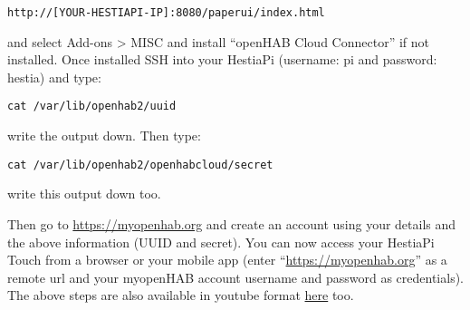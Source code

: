 \texttt{http://[YOUR-HESTIAPI-IP]:8080/paperui/index.html}

and select Add-ons > MISC and install ``openHAB Cloud Connector'' if not
installed. Once installed SSH into your HestiaPi (username: pi and password:
hestia) and type:

\texttt{cat /var/lib/openhab2/uuid}

write the output down. Then type:

\texttt{cat /var/lib/openhab2/openhabcloud/secret}

write this output down too.

Then go to \url{https://myopenhab.org} and create an account using your details
and the above information (UUID and secret). You can now access your HestiaPi
Touch from a browser or your mobile app (enter ``\url{https://myopenhab.org}''
as a remote url and your myopenHAB account username and password as
credentials).  The above steps are also available in youtube format
\href{https://www.youtube.com/watch?v=joz5f4ejJVc}{here} too.
